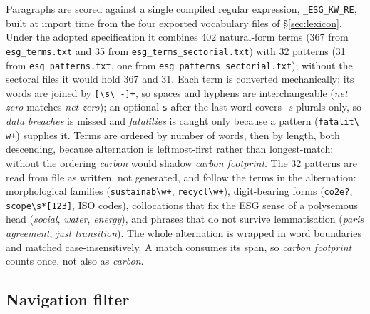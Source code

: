 Paragraphs are scored against a single compiled regular expression,
\texttt{\_ESG\_KW\_RE}, built at import time from the four exported
vocabulary files of \S\ref{sec:lexicon}. Under the adopted specification it
combines 402 natural-form terms (367 from \texttt{esg\_terms.txt} and 35 from
\texttt{esg\_terms\_sectorial.txt}) with 32 patterns (31 from
\texttt{esg\_patterns.txt}, one from \texttt{esg\_patterns\_sectorial.txt});
without the sectoral files it would hold 367 and 31. Each term is converted
mechanically: its words are joined by \texttt{[\textbackslash s\textbackslash
-]+}, so spaces and hyphens are interchangeable (\emph{net zero} matches
\emph{net-zero}); an optional \texttt{s} after the last word covers
\emph{-s} plurals only, so \emph{data breaches} is missed and
\emph{fatalities} is caught only because a pattern (\texttt{fatalit\textbackslash
w+}) supplies it. Terms are ordered by number of words, then by length, both
descending, because alternation is leftmost-first rather than longest-match:
without the ordering \emph{carbon} would shadow \emph{carbon footprint}.
The 32 patterns are read from file as written, not generated, and follow the
terms in the alternation: morphological families
(\texttt{sustainab\textbackslash w+}, \texttt{recycl\textbackslash w+}),
digit-bearing forms (\texttt{co2e?}, \texttt{scope\textbackslash s*[123]},
ISO codes), collocations that fix the ESG sense of a polysemous head
(\emph{social}, \emph{water}, \emph{energy}), and phrases that do not
survive lemmatisation (\emph{paris agreement}, \emph{just transition}). The
whole alternation is wrapped in word boundaries and matched
case-insensitively. A match consumes its span, so \emph{carbon footprint}
counts once, not also as \emph{carbon}.

\subsection{Navigation filter}
\label{sec:extraction-nav}

